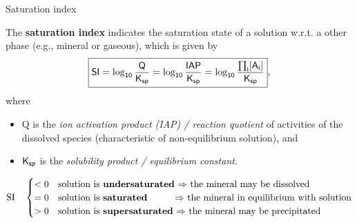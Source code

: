 %
\begin{frame}{Saturation index}

The \alert{\textbf{saturation index}} indicates the saturation state of
a solution w.r.t. a other phase (e.g., mineral or gaseous), which is given by
%
\[
\boxed{ \mathsf{SI
= \log_{10} \frac{Q}{K_{\sf sp}} 
= \log_{10} \frac{IAP}{K_{\sf sp}}
= \log_{10} \frac{\prod_i [A_i]}{K_{\sf sp}}}},
\] 
where 
\begin{itemize}
\item Q is the \emph{ion activation product (IAP) / reaction quotient} of activities of the dissolved species (characteristic of non-equilibrium solution), 
and 
\item $\mathsf{K}_{\sf sp}$ is the \emph{solubility product / equilibrium constant}. 
\end{itemize}
%
\[
\mathrm{SI} \quad 
\begin{cases}
< 0& \mbox{solution is \textbf{undersaturated} $\Rightarrow$ the mineral may be dissolved }\\
= 0& \mbox{solution is \textbf{saturated} \qquad \; $\Rightarrow$ the mineral in equilibrium with solution}\\
> 0 & \mbox{solution is \textbf{supersaturated} $\Rightarrow$ the mineral may be precipitated}
\end{cases}
\]
%

\end{frame}
%
%
